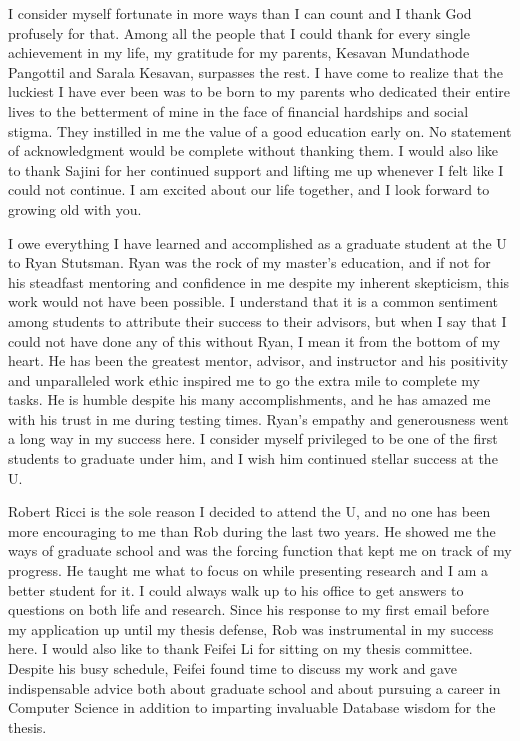 I consider myself fortunate in more ways than I can count and I thank God profusely for that. 
Among all the people that I could thank for every single achievement in my life, my gratitude for my parents, Kesavan Mundathode Pangottil and Sarala Kesavan, surpasses the rest. 
I have come to realize that the luckiest I have ever been was to be born to my parents who dedicated their entire lives to the betterment of mine in the face of financial hardships and social stigma. 
They instilled in me the value of a good education early on. No statement of acknowledgment would be complete without thanking them. I would also like to thank Sajini for her continued support and lifting 
me up whenever I felt like I could not continue. I am excited about our life together, and I look forward to growing old with you.

I owe everything I have learned and accomplished as a graduate student at the U to Ryan Stutsman. 
Ryan was the rock of my master's education, and if not for his steadfast mentoring and confidence in me despite my inherent skepticism, this work would not have been possible. 
I understand that it is a common sentiment among students to attribute their success to their advisors, but when I say that I could not have done any of this without Ryan, I mean it from the bottom of my heart. 
He has been the greatest mentor, advisor, and instructor and his positivity and unparalleled work ethic inspired me to go the extra mile to complete my tasks. 
He is humble despite his many accomplishments, and he has amazed me with his trust in me during testing times. 
Ryan's empathy and generousness went a long way in my success here. 
I consider myself privileged to be one of the first students to graduate under him, and I wish him continued stellar success at the U.

Robert Ricci is the sole reason I decided to attend the U, and no one has been more \linebreak encouraging to me than Rob during the last two years.
He showed me the ways of \linebreak graduate school and was the forcing function that kept me on track of my progress. 
He taught me what to focus on while presenting research and I am a better student for it.\linebreak 
I could always walk up to his office to get answers to questions on both life and research. 
Since his response to my first email before my application up until my thesis defense, \linebreak Rob was instrumental in my success here. 
I would also like to thank Feifei Li for sitting on my thesis committee. Despite his busy schedule, Feifei found time to discuss my work and gave indispensable advice both about graduate school and about pursuing a career in Computer Science in addition to imparting invaluable Database wisdom for the thesis.

